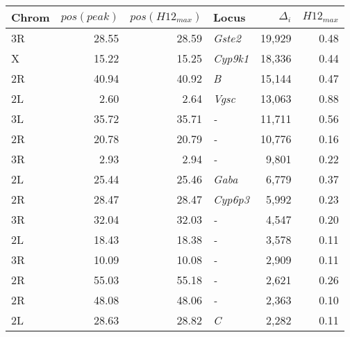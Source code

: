 \begin{tabular}{lrrlrr}
\toprule
Chrom & $pos(peak)$ & $pos(H12_{max})$ &            Locus & $\Delta_{i}$ & $H12_{max}$ \\
\midrule
   3R &       28.55 &            28.59 &   \textit{Gste2} &       19,929 &        0.48 \\
    X &       15.22 &            15.25 &  \textit{Cyp9k1} &       18,336 &        0.44 \\
   2R &       40.94 &            40.92 &       \textit{B} &       15,144 &        0.47 \\
   2L &        2.60 &             2.64 &    \textit{Vgsc} &       13,063 &        0.88 \\
   3L &       35.72 &            35.71 &       \textit{-} &       11,711 &        0.56 \\
   2R &       20.78 &            20.79 &       \textit{-} &       10,776 &        0.16 \\
   3R &        2.93 &             2.94 &       \textit{-} &        9,801 &        0.22 \\
   2L &       25.44 &            25.46 &    \textit{Gaba} &        6,779 &        0.37 \\
   2R &       28.47 &            28.47 &  \textit{Cyp6p3} &        5,992 &        0.23 \\
   3R &       32.04 &            32.03 &       \textit{-} &        4,547 &        0.20 \\
   2L &       18.43 &            18.38 &       \textit{-} &        3,578 &        0.11 \\
   3R &       10.09 &            10.08 &       \textit{-} &        2,909 &        0.11 \\
   2R &       55.03 &            55.18 &       \textit{-} &        2,621 &        0.26 \\
   2R &       48.08 &            48.06 &       \textit{-} &        2,363 &        0.10 \\
   2L &       28.63 &            28.82 &       \textit{C} &        2,282 &        0.11 \\
\bottomrule
\end{tabular}
